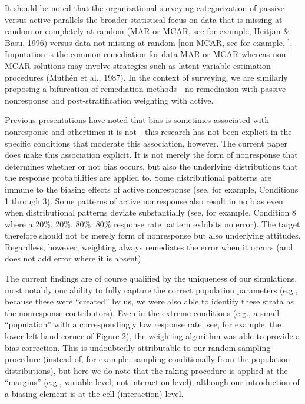 \documentclass[
  man,floatsintext]{apa7}
\begin{document}
It should be noted that the organizational surveying categorization of passive versus active parallels the broader statistical focus on data that is missing at random or completely at random (MAR or MCAR, see for example, Heitjan \& Basu, 1996) versus data not missing at random {[}non-MCAR, see for example, {]}. Imputation is the common remediation for data MAR or MCAR whereas non-MCAR solutions may involve strategies such as latent variable estimation procedures (Muthén et al., 1987). In the context of surveying, we are similarly proposing a bifurcation of remediation methods - no remediation with passive nonresponse and post-stratification weighting with active.

Previous presentations have noted that bias is sometimes associated with nonresponse and othertimes it is not - this research has not been explicit in the specific conditions that moderate this association, however. The current paper does make this association explicit. It is not merely the form of nonresponse that determines whether or not bias occurs, but also the underlying distributions that the response probabilities are applied to. Some distributional patterns are immune to the biasing effects of active nonresponse (see, for example, Conditions 1 through 3). Some patterns of active nonresponse also result in no bias even when distributional patterns deviate substantially (see, for example, Condition 8 where a 20\%, 20\%, 80\%, 80\% response rate pattern exhibits no error). The target therefore should not be merely form of nonresponse but also underlying attitudes. Regardless, however, weighting always remediates the error when it occurs (and does not add error where it is absent).

The current findings are of course qualified by the uniqueness of our simulations, most notably our ability to fully capture the correct population parameters (e.g., because these were ``created'' by us, we were also able to identify these strata as the nonresponse contributors). Even in the extreme conditions (e.g., a small ``population'' with a correspondingly low response rate; see, for example, the lower-left hand corner of Figure 2), the weighting algorithm was able to provide a bias correction. This is undoubtedly attributable to our random sampling procedure (instead of, for example, sampling conditionally from the population distributions), but here we do note that the raking procedure is applied at the ``margins'' (e.g., variable level, not interaction level), although our introduction of a biasing element is at the cell (interaction) level.
\end{document}
